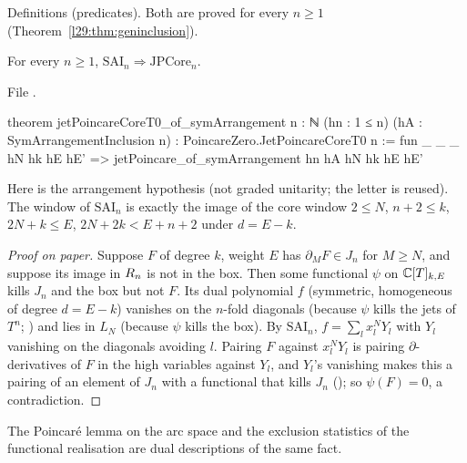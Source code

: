 \begin{status}
Definitions (predicates). Both are proved for every $n\ge1$ (Theorem~\ref{l29:thm:geninclusion}).
\end{status}

\begin{theorem}\label{l29:thm:poincarecore}
For every $n\ge1$, $\mathrm{SAI}_n\Rightarrow\mathrm{JPCore}_n$.
\end{theorem}

\noindent File .
\begin{leancode}
theorem jetPoincareCoreT0_of_symArrangement {n : ℕ} (hn : 1 ≤ n)
    (hA : SymArrangementInclusion n) : PoincareZero.JetPoincareCoreT0 n :=
  fun _ _ _ hN hk hE hE' => jetPoincare_of_symArrangement hn hA hN hk hE hE'
\end{leancode}

\begin{dictionary}
Here  is the arrangement hypothesis (not graded unitarity; the letter is reused). The window of
$\mathrm{SAI}_n$ is exactly the image of the core window $2\le N$, $n+2\le k$, $2N+k\le E$, $2N+2k<E+n+2$ under $d=E-k$.
\end{dictionary}

\begin{proof}[Proof on paper]
Suppose $F$ of degree $k$, weight $E$ has $\partial_MF\in J_n$ for $M\ge N$, and suppose its image in $R_n$ is
not in the box. Then some functional $\psi$ on ${\mathbb{C}}[T]_{k,E}$ kills $J_n$ and the box but not $F$. Its dual polynomial
$f$ (symmetric, homogeneous of degree $d=E-k$) vanishes on the $n$-fold diagonals (because $\psi$ kills the jets of
$T^n$; ) and lies in $L_N$ (because $\psi$ kills the box). By $\mathrm{SAI}_n$, $f=\sum_lx_l^NY_l$
with $Y_l$ vanishing on the diagonals avoiding $l$. Pairing $F$ against $x_l^NY_l$ is pairing $\partial$-derivatives of
$F$ in the high variables against $Y_l$, and $Y_l$'s vanishing makes this a pairing of an element of $J_n$ with a
functional that kills $J_n$ (); so $\psi(F)=0$, a contradiction.
\end{proof}

\begin{physics}
The Poincar\'e lemma on the arc space and the exclusion statistics of the functional realisation are dual descriptions of
the same fact.
\end{physics}

